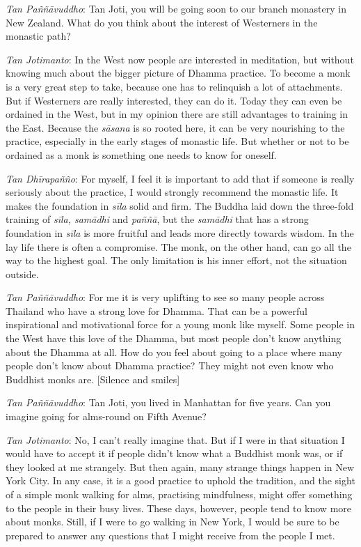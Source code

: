 \emph{Tan Paññāvuddho}: Tan Joti, you will be going soon to our branch
monastery in New Zealand. What do you think about the interest of
Westerners in the monastic path? 

\emph{Tan Jotimanto}: In the West now people are interested in
meditation, but without knowing much about the bigger picture of Dhamma
practice. To become a monk is a very great step to take, because one has
to relinquish a lot of attachments. But if Westerners are really
interested, they can do it. Today they can even be ordained in the West, 
but in my opinion there are still advantages to training in the East. 
Because the \emph{sāsana} is so rooted here, it can be very nourishing
to the practice, especially in the early stages of monastic life. But
whether or not to be ordained as a monk is something one needs to know
for oneself. 

\emph{Tan Dhīrapañño}: For myself, I feel it is important to add that
if someone is really seriously about the practice, I would strongly
recommend the monastic life. It makes the foundation in \emph{sīla}
solid and firm. The Buddha laid down the three-fold training of
\emph{sīla, samādhi} and \emph{paññā}, but the \emph{samādhi} that has a
strong foundation in \emph{sīla} is more fruitful and leads more
directly towards wisdom. In the lay life there is often a compromise. 
The monk, on the other hand, can go all the way to the highest goal. The
only limitation is his inner effort, not the situation outside. 

\emph{Tan Paññāvuddho}: For me it is very uplifting to see so many
people across Thailand who have a strong love for Dhamma. That can be a
powerful inspirational and motivational force for a young monk like
myself. Some people in the West have this love of the Dhamma, but most
people don't know anything about the Dhamma at all. How do you feel
about going to a place where many people don't know about Dhamma
practice? They might not even know who Buddhist monks are. [Silence and smiles]

\emph{Tan Paññāvuddho}: Tan Joti, you lived in Manhattan for five
years. Can you imagine going for alms-round on Fifth Avenue? 

\emph{Tan Jotimanto}: No, I can't really imagine that. But if I were in
that situation I would have to accept it if people didn't know what a
Buddhist monk was, or if they looked at me strangely. But then again, 
many strange things happen in New York City. In any case, it is a good
practice to uphold the tradition, and the sight of a simple monk walking
for alms, practising mindfulness, might offer something to the people in
their busy lives. These days, however, people tend to know more about
monks. Still, if I were to go walking in New York, I would be sure to be
prepared to answer any questions that I might receive from the people I
met. 


